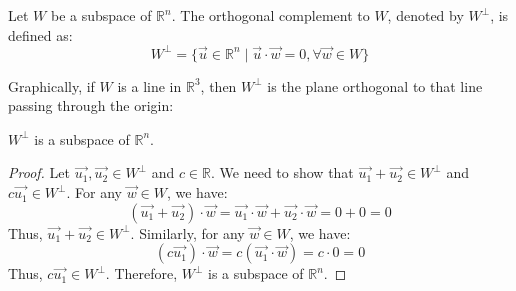 \begin{definition}
    Let $W$ be a subspace of $\mathbb{R}^n$. The orthogonal complement to $W$, denoted by $W^{\perp}$, is defined as:
    \[
        W^{\perp} = \{ \vec{u} \in \mathbb{R}^n \mid \vec{u} \cdot \vec{w} = 0, \forall \vec{w} \in W \}
    \]
\end{definition}
Graphically, if $W$ is a line in $\mathbb{R}^3$, then $W^{\perp}$ is the plane orthogonal to that line passing through the origin:
\begin{center}
\end{center}

\begin{theorem}
    $W^{\perp}$ is a subspace of $\mathbb{R}^n$.
\end{theorem}
\begin{proof}
    Let $\vec{u_1}, \vec{u_2} \in W^{\perp}$ and $c \in \mathbb{R}$. We need to show that $\vec{u_1} + \vec{u_2} \in W^{\perp}$ and $c \vec{u_1} \in W^{\perp}$.
    For any $\vec{w} \in W$, we have:
    \[
        (\vec{u_1} + \vec{u_2}) \cdot \vec{w} = \vec{u_1} \cdot \vec{w} + \vec{u_2} \cdot \vec{w} = 0 + 0 = 0
    \]
    Thus, $\vec{u_1} + \vec{u_2} \in W^{\perp}$.
    Similarly, for any $\vec{w} \in W$, we have:
    \[
        (c \vec{u_1}) \cdot \vec{w} = c (\vec{u_1} \cdot \vec{w}) = c \cdot 0 = 0
    \]
    Thus, $c \vec{u_1} \in W^{\perp}$.
    Therefore, $W^{\perp}$ is a subspace of $\mathbb{R}^n$.
\end{proof}

